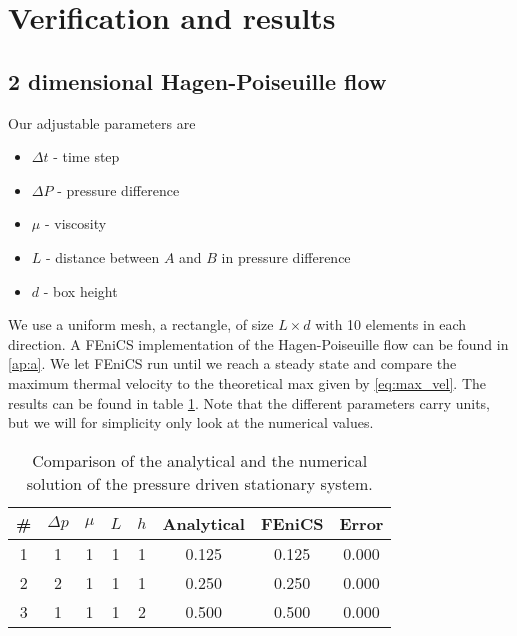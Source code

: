 \documentclass[a4paper,10pt]{article}
\renewcommand{\(}{\left(}
\renewcommand{\)}{\right)}
\begin{document}
\section{Verification and results}
\subsection{2 dimensional Hagen-Poiseuille flow}
Our adjustable parameters are
\begin{itemize}
\item $\Delta t$ - time step
\item $\Delta P$ - pressure difference
\item $\mu$ - viscosity
\item $L$ - distance between $A$ and $B$ in pressure difference
\item $d$ - box height
\end{itemize}
We use a uniform mesh, a rectangle, of size $L\times d$ with 10 elements in each direction. A FEniCS implementation of the Hagen-Poiseuille flow can be found in \ref{ap:a}. We let FEniCS run until we reach a steady state and compare the maximum thermal velocity to the theoretical max given by \eqref{eq:max_vel}. The results can be found in table \ref{tab:res_hagen_poiseuille}. Note that the different parameters carry units, but we will for simplicity only look at the numerical values.

\begin{table}[h!]
  \begin{center}
    \begin{tabular}[width=4in]{|c|c|c|c|c|c|c|c|}
      \hline
      \# & $\Delta p$ & $\mu$ & $L$ & $h$ & Analytical & FEniCS & Error\\ \hline
      1 & 1 & 1 & 1 & 1 & 0.125 & 0.125 & 0.000\\
      2 & 2 & 1 & 1 & 1 & 0.250 & 0.250 & 0.000\\
      3 & 1 & 1 & 1 & 2 & 0.500 & 0.500 & 0.000\\
      \hline
    \end{tabular}
  \caption{Comparison of the analytical and the numerical solution of the pressure driven stationary system.}
  \label{tab:res_hagen_poiseuille}
  \end{center}
\end{table}
\end{document}
